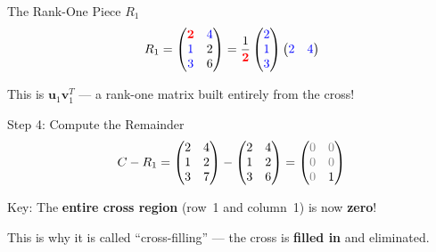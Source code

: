 \documentclass[10pt]{beamer}
\theoremstyle{definition}
\newcommand{\pvt}[1]{{\color{red}\mathbf{#1}}}       %
\newcommand{\crs}[1]{{\color{blue}#1}}                %
\newcommand{\rem}[1]{{\color{gray}#1}}                %
\newcommand{\x}[1]{\alert{\textbf{#1}}}
\begin{document}
\begin{frame}{The Rank-One Piece $R_1$}
$$R_1 = \begin{pmatrix}
\pvt{2} & \crs{4} \\
\crs{1} & 2 \\
\crs{3} & 6
\end{pmatrix}
= \frac{1}{\pvt{2}}
\begin{pmatrix} \crs{2} \\ \crs{1} \\ \crs{3} \end{pmatrix}
\begin{pmatrix} \crs{2} & \crs{4} \end{pmatrix}$$

\vfill
This is $\mathbf{u}_1 \mathbf{v}_1^T$ — a rank-one matrix built entirely from the cross!
\end{frame}

\begin{frame}{Step 4: Compute the Remainder}
$$C - R_1 = \begin{pmatrix}
2 & 4 \\
1 & 2 \\
3 & 7
\end{pmatrix}
- \begin{pmatrix}
2 & 4 \\
1 & 2 \\
3 & 6
\end{pmatrix}
= \begin{pmatrix}
\rem{0} & \rem{0} \\
\rem{0} & \rem{0} \\
\rem{0} & 1
\end{pmatrix}$$

\vfill
Key: The \x{entire cross region} (row~1 and column~1) is now \x{zero}!

\vfill
This is why it is called ``cross-filling'' — the cross is \x{filled in} and eliminated.
\end{frame}
\end{document}
